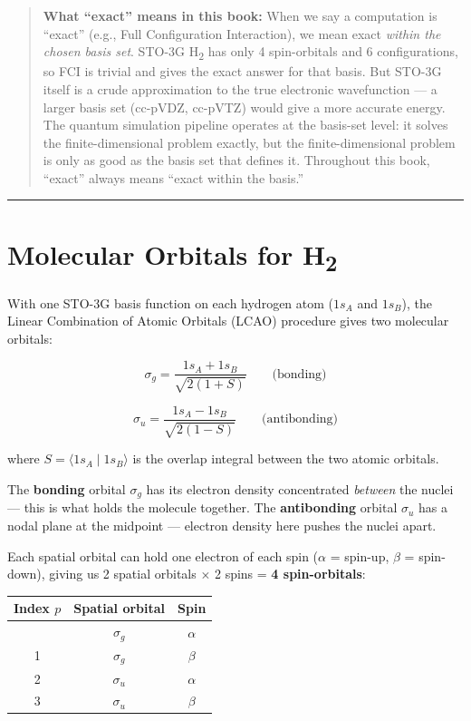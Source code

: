 \documentclass[
  11pt,
  oneside]{book}
\begin{document}
\begin{quote}
\textbf{What ``exact'' means in this book:} When we say a computation is
``exact'' (e.g., Full Configuration Interaction), we mean exact
\emph{within the chosen basis set}. STO-3G H\textsubscript{2} has only 4 spin-orbitals
and 6 configurations, so FCI is trivial and gives the exact answer for
that basis. But STO-3G itself is a crude approximation to the true
electronic wavefunction --- a larger basis set (cc-pVDZ, cc-pVTZ) would
give a more accurate energy. The quantum simulation pipeline operates at
the basis-set level: it solves the finite-dimensional problem exactly,
but the finite-dimensional problem is only as good as the basis set that
defines it. Throughout this book, ``exact'' always means ``exact within
the basis.''
\end{quote}

\begin{center}\rule{0.5\linewidth}{0.5pt}\end{center}

\section{Molecular Orbitals for
H\textsubscript{2}}\label{molecular-orbitals-for-hux2082}

With one STO-3G basis function on each hydrogen atom (\(1s_A\) and
\(1s_B\)), the Linear Combination of Atomic Orbitals (LCAO) procedure
gives two molecular orbitals:

\[\sigma_g = \frac{1s_A + 1s_B}{\sqrt{2(1+S)}} \qquad \text{(bonding)}\]

\[\sigma_u = \frac{1s_A - 1s_B}{\sqrt{2(1-S)}} \qquad \text{(antibonding)}\]

where \(S = \langle 1s_A \mid 1s_B \rangle\) is the overlap integral
between the two atomic orbitals.

The \textbf{bonding} orbital \(\sigma_g\) has its electron density
concentrated \emph{between} the nuclei --- this is what holds the
molecule together. The \textbf{antibonding} orbital \(\sigma_u\) has a
nodal plane at the midpoint --- electron density here pushes the nuclei
apart.

Each spatial orbital can hold one electron of each spin (\(\alpha\) =
spin-up, \(\beta\) = spin-down), giving us 2 spatial orbitals $\times$ 2 spins
= \textbf{4 spin-orbitals}:

\begin{longtable}[]{@{}ccc@{}}
\toprule\noalign{}
Index \(p\) & Spatial orbital & Spin \\
\midrule\noalign{}
\endhead
\bottomrule\noalign{}
\endlastfoot
0 & \(\sigma_g\) & \(\alpha\) \\
1 & \(\sigma_g\) & \(\beta\) \\
2 & \(\sigma_u\) & \(\alpha\) \\
3 & \(\sigma_u\) & \(\beta\) \\
\end{longtable}
\end{document}

